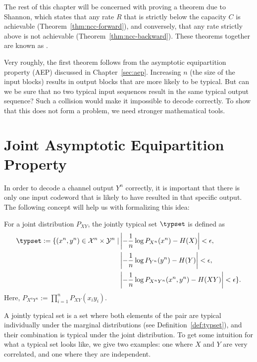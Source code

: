 The rest of this chapter will be concerned with proving a theorem due to Shannon, which states that any rate $R$ that is strictly below the capacity $C$ is achievable (Theorem~\ref{thm:ncc-forward}), and conversely, that any rate strictly above is not achievable (Theorem~\ref{thm:ncc-backward}). These theorems together are known as .

Very roughly, the first theorem follows from the asymptotic equipartition property (AEP) discussed in Chapter~\ref{sec:aep}. Increasing $n$ (the size of the input blocks) results in output blocks that are more likely to be typical. But can we be sure that no two typical input sequences result in the same typical output sequence? Such a collision would make it impossible to decode correctly. To show that this does not form a problem, we need stronger mathematical tools.

\section{Joint Asymptotic Equipartition Property}
In order to decode a channel output $Y^n$ correctly, it is important that there is only one input codeword that is likely to have resulted in that specific output. The following concept will help us with formalizing this idea:

\begin{definition}\label{def:joint-typicality}
For a joint distribution $P_{XY}$, the jointly typical set $\typset$ is defined as
\begin{align*}
\typset := \{(x^n,y^n) \in \mathcal{X}^n \times \mathcal{Y}^n \mid &\left| - \frac{1}{n} \log P_{X^n}(x^n) - H(X)\right| < \epsilon,\\
&\left| - \frac{1}{n} \log P_{Y^n}(y^n) - H(Y)\right| < \epsilon,\\
&\left| - \frac{1}{n} \log P_{X^nY^n}(x^n,y^n) - H(XY)\right| < \epsilon\}.
\end{align*}
Here, $P_{X^nY^n} := \prod_{i=1}^nP_{XY}(x_iy_i)$.
\end{definition}
A jointly typical set is a set where both elements of the pair are typical individually under the marginal distributions (see Definition~\ref{def:typset}), and their combination is typical under the joint distribution. To get some intuition for what a typical set looks like, we give two examples: one where $X$ and $Y$ are very correlated, and one where they are independent.



